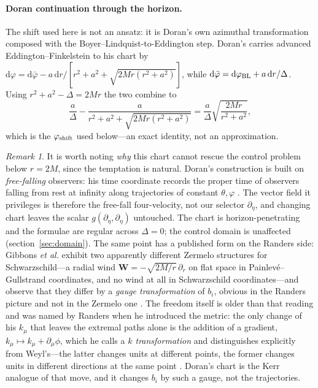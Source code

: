 \documentclass[12pt]{iopart}
\theoremstyle{plain}
\theoremstyle{definition}
\theoremstyle{remark}
\newtheorem{remark}[proposition]{Remark}
\newcommand{\dd}{\mathrm{d}}
\begin{document}
\paragraph{Doran continuation through the horizon.} The shift used here is not an
ansatz: it is Doran's own azimuthal transformation composed with the
Boyer--Lindquist-to-Eddington step. Doran's \cite[Eq.~(21)]{Doran2000} carries
advanced Eddington--Finkelstein to his chart by
$\dd\varphi=\dd\bar\varphi-a\,\dd r/[r^2+a^2+\sqrt{2Mr(r^2+a^2)}]$, while
$\dd\bar\varphi=\dd\varphi_{\rm BL}+a\,\dd r/\Delta$. Using
$r^2+a^2-\Delta=2Mr$ the two combine to
\begin{equation}
    \frac{a}{\Delta}-\frac{a}{r^2+a^2+\sqrt{2Mr(r^2+a^2)}}
      =\frac{a}{\Delta}\sqrt{\frac{2Mr}{r^2+a^2}} ,
    \label{eq:doran-shift}
\end{equation}
which is the $\varphi_{\rm shift}$ used below---an exact identity, not an
approximation.

\begin{remark}
It is worth noting \emph{why} this chart cannot rescue the control problem below
$r=2M$, since the temptation is natural. Doran's construction is built on
\emph{free-falling} observers: his time coordinate records the proper time of
observers falling from rest at infinity along trajectories of constant
$\theta,\varphi$ \cite{Doran2000}. The vector field it privileges is therefore
the free-fall four-velocity, not our selector $\partial_\eta$, and changing chart
leaves the scalar $g(\partial_\eta,\partial_\eta)$ untouched. The chart is
horizon-penetrating and the formulae are regular across $\Delta=0$; the control
domain is unaffected (section~\ref{sec:domain}). The same point has a published
form on the Randers side: Gibbons \emph{et al.} exhibit two apparently different
Zermelo structures for Schwarzschild---a radial wind $\mathbf W=-\sqrt{2M/r}\,
\partial_r$ on flat space in Painlev\'e--Gullstrand coordinates, and no wind at all
in Schwarzschild coordinates---and observe that they differ by a \emph{gauge
transformation} of $b_i$, obvious in the Randers picture and not in the Zermelo one
\cite[Eqs.~(32)--(34)]{GibbonsRanders2009}. The freedom itself is older than that
reading and was named by Randers when he introduced the metric: the only change of
his $k_\mu$ that leaves the extremal paths alone is the addition of a gradient,
$k_\mu\mapsto k_\mu+\partial_\mu\phi$, which he calls a \emph{$k$ transformation}
and distinguishes explicitly from Weyl's---the latter changes units at different
points, the former changes units in different directions at the same point
\cite[Eqs.~(2)--(4)]{Randers1941}. Doran's chart is the Kerr analogue of that move,
and it changes $b_i$ by such a gauge, not the trajectories.
\end{remark}
\end{document}
